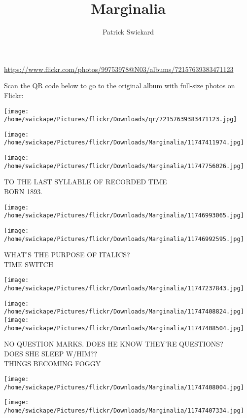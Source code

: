 \documentclass[10pt,letterpaper]{article}
\title{Marginalia}
\author{Patrick Swickard}
\date{}
\begin{document}
\maketitle

\url{https://www.flickr.com/photos/99753978@N03/albums/72157639383471123}

Scan the QR code below to go to the original album with full-size photos on Flickr:

\texttt{[image: /home/swickape/Pictures/flickr/Downloads/qr/72157639383471123.jpg]}
\pagebreak

\texttt{[image: /home/swickape/Pictures/flickr/Downloads/Marginalia/11747411974.jpg]}

\vspace{0.25in}
\texttt{[image: /home/swickape/Pictures/flickr/Downloads/Marginalia/11747756026.jpg]}

TO THE LAST SYLLABLE OF RECORDED TIME\\
BORN 1893.
\pagebreak

\texttt{[image: /home/swickape/Pictures/flickr/Downloads/Marginalia/11746993065.jpg]}

\vspace{0.25in}
\texttt{[image: /home/swickape/Pictures/flickr/Downloads/Marginalia/11746992595.jpg]}

WHAT'S THE PURPOSE OF ITALICS?\\
TIME SWITCH
\pagebreak

\texttt{[image: /home/swickape/Pictures/flickr/Downloads/Marginalia/11747237843.jpg]}

\vspace{0.25in}
\texttt{[image: /home/swickape/Pictures/flickr/Downloads/Marginalia/11747408824.jpg]}
\texttt{[image: /home/swickape/Pictures/flickr/Downloads/Marginalia/11747408504.jpg]}

NO QUESTION MARKS.  DOES HE KNOW THEY'RE QUESTIONS?\\
DOES SHE SLEEP W/HIM??\\
THINGS BECOMING FOGGY
\pagebreak

\texttt{[image: /home/swickape/Pictures/flickr/Downloads/Marginalia/11747408004.jpg]}

\vspace{0.25in}
\texttt{[image: /home/swickape/Pictures/flickr/Downloads/Marginalia/11747407334.jpg]}
\end{document}
